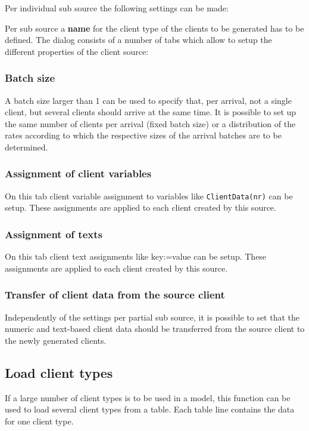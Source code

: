 Per individual sub source the following settings can be made:

Per sub source a \textbf{name} for the client type of the clients to be generated has to be defined.
The dialog consists of a number of tabs which allow to setup the different properties of the client source:

\subsubsection*{Batch size}

A batch size larger than 1 can be used to specify that, per arrival, not a single client,
but several clients should arrive at the same time. It is possible to set up the same number
of clients per arrival (fixed batch size) or a distribution of the rates according to which
the respective sizes of the arrival batches are to be determined.

\subsubsection*{Assignment of client variables}

On this tab client variable assignment to variables like \texttt{ClientData(nr)} can be setup.
These assignments are applied to each client created by this source.

\subsubsection*{Assignment of texts}

On this tab client text assignments like key:=value can be setup.
These assignments are applied to each client created by this source.

\subsubsection*{Transfer of client data from the source client}

Independently of the settings per partial sub source, it is possible to set that
the numeric and text-based client data should be transferred from the source client
to the newly generated clients.

\subsection*{Load client types}

If a large number of client types is to be used in a model, this function can be used
to load several client types from a table. Each table line contains the data for one client type.

